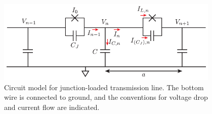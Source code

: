 \begin{figure}
\begin{center}
\includegraphics[width=4.2in]{twpa_theory/TWPA_circuit_model}
\end{center}
\caption[Circuit model for junction-loaded transmission line]{Circuit model for junction-loaded transmission line.  The bottom wire is connected to ground, and the conventions for voltage drop and current flow are indicated.}
\label{fig:TWPA_circuit_model}
\end{figure}


